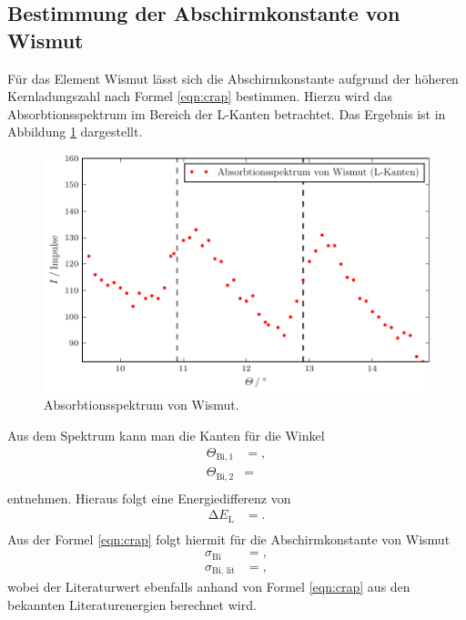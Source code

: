 \subsection{Bestimmung der Abschirmkonstante von Wismut}
Für das Element Wismut lässt sich die Abschirmkonstante aufgrund der höheren Kernladungszahl nach Formel \eqref{eqn:crap} bestimmen.
Hierzu wird das Absorbtionsspektrum im Bereich der L-Kanten betrachtet. Das Ergebnis ist in Abbildung \ref{fig:plot8} dargestellt.
\begin{figure}
  \centering
  \includegraphics{build/plot_wi.pdf}
  \caption{Absorbtionsspektrum von Wismut.}
  \label{fig:plot8}
\end{figure}
Aus dem Spektrum kann man die Kanten für die Winkel
\begin{align*}
  \Theta_{\text{Bi},1} &= , \\
  \Theta_{\text{Bi},2} &=  \\
\end{align*}
entnehmen.
Hieraus folgt eine Energiedifferenz von
\begin{align*}
  \increment E_\text{L} &= . \\
\end{align*}
Aus der Formel \eqref{eqn:crap} folgt hiermit für die Abschirmkonstante von Wismut
\begin{align*}
  \sigma_{\text{Bi}} &= , \\
  \sigma_\text{Bi, lit} &= ,
\end{align*}
wobei der Literaturwert ebenfalls anhand von Formel \eqref{eqn:crap} aus den bekannten Literaturenergien \cite{energie} berechnet wird.
